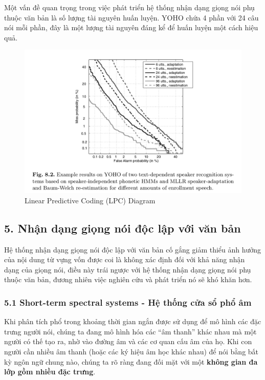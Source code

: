 \documentclass{article}
\begin{document}
	Một vấn đề quan trọng trong việc phát triển hệ thống nhận dạng giọng nói phụ thuộc văn bản là số lượng tài nguyên huấn luyện. YOHO chứa 4 phần với 24 câu nói mỗi phần, đây là một lượng tài nguyên đáng kể để huấn luyện một cách hiệu quả.
	
	\begin{figure}[H]
		\centering
		\includegraphics[width=1\linewidth]{images/figure_8_2.png}
		\caption{Linear Predictive Coding (LPC) Diagram}
		\label{fig:writing-thesis}
	\end{figure}
		
	\subsection{5. Nhận dạng giọng nói độc lập với văn bản}
	\qquad Hệ thống nhận dạng giọng nói độc lập với văn bản cố gắng giảm thiểu ảnh hưởng của nội dung từ vựng vốn được coi là không xác định đối với khả năng nhận dạng của giọng nói, điều này trái ngược với hệ thống nhận dạng giọng nói phụ thuộc văn bản, đương nhiên việc nghiên cứu và phát triển nó sẽ khó khăn hơn.
	
	\subsubsection{5.1 Short-term spectral systems - Hệ thống cửa sổ phổ âm}
	\qquad Khi phân tích phổ trong khoảng thời gian ngắn được sử dụng để mô hình các đặc trưng người nói, chúng ta đang mô hình hóa các “âm thanh” khác nhau mà một người có thế tạo ra, nhờ vào đường âm và các cơ quan cấu âm của họ. Khi con người cần nhiều âm thanh (hoặc các ký hiệu âm học khác nhau) để nói bằng bất kỳ ngôn ngữ chung nào, chúng ta rõ ràng đang đối mặt với một \textbf{không gian đa lớp gồm nhiều đặc trưng}.
	
\end{document}

